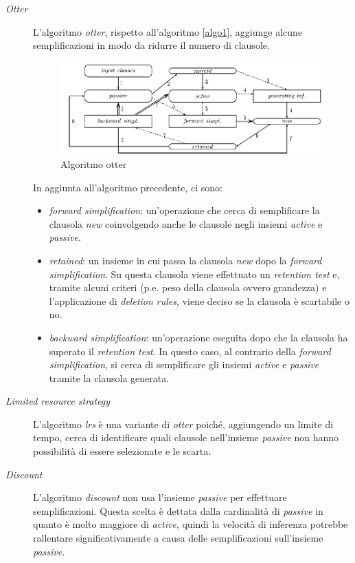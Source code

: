 \begin{description}
    \item[\emph{Otter}] L'algoritmo \emph{otter}, rispetto all'algoritmo \ref{algo1}, aggiunge alcune semplificazioni in modo da ridurre il numero di clausole.
    \begin{figure}[H]
        \centering
        \includegraphics[width=\columnwidth]{figures/otter.png}
        \caption{Algoritmo otter \cite{riazanov2002design}}
    \end{figure}
    In aggiunta all'algoritmo precedente, ci sono:
    \begin{itemize}
        \item \emph{forward simplification}: un'operazione che cerca di semplificare la clausola \emph{new} coinvolgendo anche 
        le clausole negli insiemi \emph{active} e \emph{passive}.
        \item \emph{retained}: un insieme in cui passa la clausola \emph{new} dopo la \emph{forward simplification}. Su questa clausola viene effettuato un 
        \emph{retention test} e, tramite alcuni criteri (p.e. peso della clausola ovvero grandezza) e l'applicazione di \emph{deletion rules}, viene deciso se la clausola 
        è scartabile o no.
        \item \emph{backward simplification}: un'operazione eseguita dopo che la clausola ha superato il \emph{retention test}. In questo caso, al contrario della \emph{forward simplification}, 
        si cerca di semplificare gli insiemi \emph{active} e \emph{passive} tramite la clausola generata.
    \end{itemize}
    \item[\emph{Limited resource strategy}] L'algoritmo \emph{lrs} è una variante di \emph{otter} poiché, aggiungendo un limite di tempo,
    cerca di identificare quali clausole nell'insieme \emph{passive} non hanno possibilità di essere selezionate e le scarta.
    \item[\emph{Discount}] L'algoritmo \emph{discount} non usa l'insieme \emph{passive} per effettuare semplificazioni. Questa scelta è dettata dalla cardinalità di \emph{passive} in quanto è molto maggiore di \emph{active},
    quindi la velocità di inferenza potrebbe rallentare significativamente a causa delle semplificazioni sull'insieme \emph{passive}. 
\end{description}


